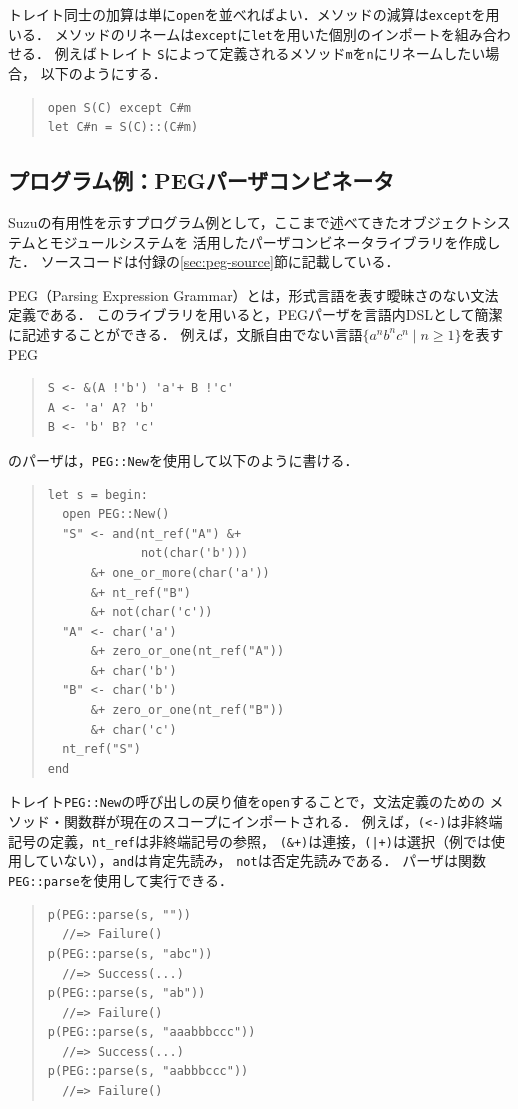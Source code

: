 \documentclass{ipsjprosym}
\begin{document}
トレイト同士の加算は単に\verb|open|を並べればよい．メソッドの減算は\verb|except|を用いる．
メソッドのリネームは\verb|except|に\verb|let|を用いた個別のインポートを組み合わせる．
例えばトレイト \verb|S|によって定義されるメソッド\verb|m|を\verb|n|にリネームしたい場合，
以下のようにする．
\begin{quote}
\begin{verbatim}
open S(C) except C#m
let C#n = S(C)::(C#m)
\end{verbatim}
\end{quote}

\subsection{プログラム例：PEGパーザコンビネータ}

Suzuの有用性を示すプログラム例として，ここまで述べてきたオブジェクトシステムとモジュールシステムを
活用したパーザコンビネータライブラリを作成した．
ソースコードは付録の\ref{sec:peg-source}節に記載している．

PEG（Parsing Expression Grammar）とは，形式言語を表す曖昧さのない文法定義である．
このライブラリを用いると，PEGパーザを言語内DSLとして簡潔に記述することができる．
例えば，文脈自由でない言語$\{a^n b^n c^n \mid n \ge 1\}$を表すPEG
\begin{quote}
\begin{verbatim}
S <- &(A !'b') 'a'+ B !'c'
A <- 'a' A? 'b'
B <- 'b' B? 'c'
\end{verbatim}
\end{quote}
のパーザは，\verb|PEG::New|を使用して以下のように書ける．
\begin{quote}
\begin{verbatim}
let s = begin:
  open PEG::New()
  "S" <- and(nt_ref("A") &+
             not(char('b')))
      &+ one_or_more(char('a'))
      &+ nt_ref("B")
      &+ not(char('c'))
  "A" <- char('a')
      &+ zero_or_one(nt_ref("A"))
      &+ char('b')
  "B" <- char('b')
      &+ zero_or_one(nt_ref("B"))
      &+ char('c')
  nt_ref("S")
end
\end{verbatim}
\end{quote}
トレイト\verb|PEG::New|の呼び出しの戻り値を\verb|open|することで，文法定義のための
メソッド・関数群が現在のスコープにインポートされる．
例えば，\verb|(<-)|は非終端記号の定義，\verb|nt_ref|は非終端記号の参照，
\verb|(&+)|は連接，\verb/(|+)/は選択（例では使用していない），\verb|and|は肯定先読み，
\verb|not|は否定先読みである．
パーザは関数\verb|PEG::parse|を使用して実行できる．
\begin{quote}
\begin{verbatim}
p(PEG::parse(s, ""))
  //=> Failure()
p(PEG::parse(s, "abc"))
  //=> Success(...)
p(PEG::parse(s, "ab"))
  //=> Failure()
p(PEG::parse(s, "aaabbbccc"))
  //=> Success(...)
p(PEG::parse(s, "aabbbccc"))
  //=> Failure()
\end{verbatim}
\end{quote}
\end{document}

